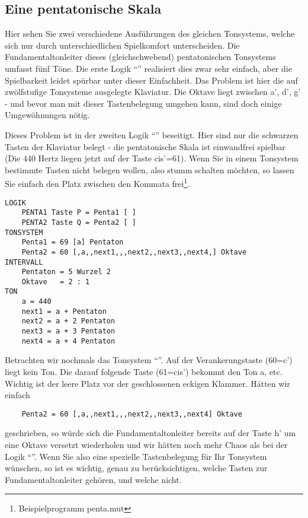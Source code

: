 \subsection{Eine pentatonische Skala}\label{sec:eine-pent-skala}
 Hier sehen Sie zwei verschiedene Ausführungen des
gleichen Tonsystems, welche sich nur durch unterschiedlichen
Spielkomfort unterscheiden. Die Fundamentaltonleiter dieses
(gleichschwebend) pentatonischen Tonsystems umfasst fünf Töne. Die
erste Logik "`"' realisiert dies zwar sehr einfach, aber
die Spielbarkeit leidet spürbar unter dieser Einfachheit. Das Problem
ist hier die auf zwölfstufige Tonsysteme ausgelegte Klaviatur. Die
Oktave liegt zwischen a', d', g' - und bevor man mit dieser
Tastenbelegung umgehen kann, sind doch einige Umgewöhnungen nötig.

Dieses Problem ist in der zweiten Logik "`"' beseitigt.
Hier sind nur die schwarzen Tasten der Klaviatur belegt - die
pentatonische Skala ist einwandfrei spielbar (Die 440 Hertz liegen
jetzt auf der Taste cis'=61). Wenn Sie in einem Tonsystem bestimmte
Tasten nicht belegen wollen, also stumm schalten möchten, so lassen
Sie einfach den Platz zwischen den Kommata
frei\footnote{Beispielprogramm penta.mut}.
\label{PENTA}
\begin{verbatim}
LOGIK
    PENTA1 Taste P = Penta1 [ ]
    PENTA2 Taste Q = Penta2 [ ]
TONSYSTEM
    Penta1 = 69 [a] Pentaton
    Penta2 = 60 [,a,,next1,,,next2,,next3,,next4,] Oktave
INTERVALL
    Pentaton = 5 Wurzel 2
    Oktave   = 2 : 1
TON
    a = 440
    next1 = a + Pentaton
    next2 = a + 2 Pentaton
    next3 = a + 3 Pentaton
    next4 = a + 4 Pentaton
\end{verbatim}
Betrachten wir nochmals das
Tonsystem "`"'. Auf der
Verankerungstaste (60=c') liegt kein Ton. Die darauf folgende
Taste (61=cis') bekommt den Ton a, etc. Wichtig ist der leere
Platz vor der geschlossenen eckigen Klammer. Hätten wir einfach
\begin{verbatim}
    Penta2 = 60 [,a,,next1,,,next2,,next3,,next4] Oktave
\end{verbatim}
geschrieben, so würde sich die Fundamentaltonleiter bereits auf der Taste h' um eine
Oktave versetzt wiederholen und wir hätten noch mehr Chaos als bei
der Logik "`"'. Wenn Sie also eine spezielle Tastenbelegung
für Ihr Tonsystem wünschen, so ist es wichtig, genau zu
berücksichtigen, welche Tasten zur Fundamentaltonleiter gehören, und welche nicht.

